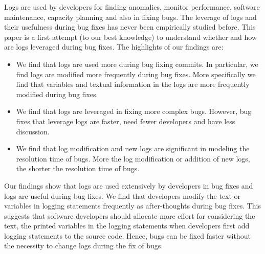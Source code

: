 \documentclass[conference]{IEEEtran}
\begin{document}
Logs are used by developers for finding anomalies, monitor performance, software maintenance, capacity planning and also in fixing bugs. The leverage of logs and their usefulness during bug fixes has never been empirically studied before. This paper is a first attempt (to our best knowledge) to understand whether and how are logs leveraged during bug fixes. The highlights of our findings are:

\begin{itemize}
	\item We find that logs are used more during bug fixing commits. In particular, we find logs are modified more frequently during bug fixes. More specifically we find that variables and textual information in the logs are more frequently modified during bug fixes. 
	\item We find that logs are leveraged in fixing more complex bugs. However, bug fixes that leverage logs are faster, need fewer developers and have less discussion.
	\item We find that log modification and new logs are significant in modeling the resolution time of bugs. More the log modification or addition of new logs, the shorter the resolution time of bugs. 
\end{itemize} 

Our findings show that logs are used extensively by developers in bug fixes and logs are useful during bug fixes. We find that developers modify the text or variables in logging statements frequently as after-thoughts during bug fixes. This suggests that software developers should allocate more effort for considering the text, the printed variables in the logging statements when developers first add logging statements to the source code. Hence, bugs can be fixed faster without the necessity to change logs during the fix of bugs. 



\end{document}
